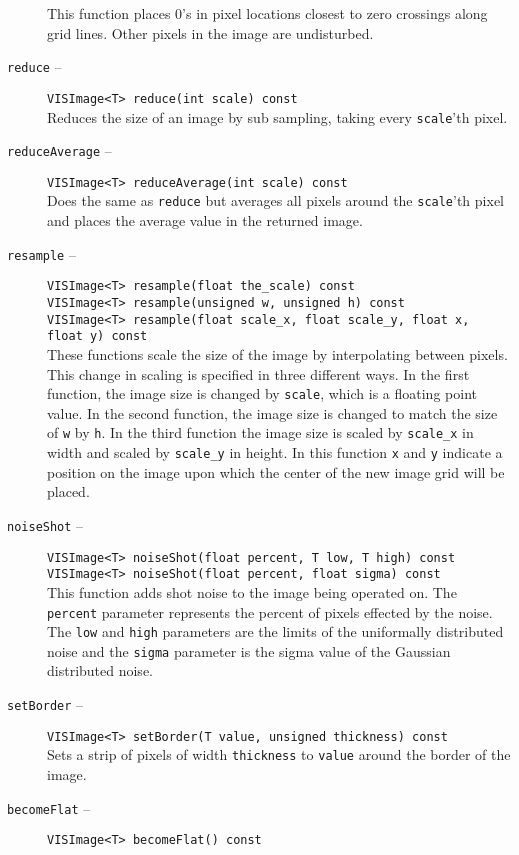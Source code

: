 \begin{description}
This function places 0's in pixel locations closest to zero crossings
along grid lines.  Other pixels in the image are undisturbed.
\item[{\tt reduce} --]
{\tt VISImage<T> reduce(int scale) const}\\
Reduces the size of an image by sub sampling, taking every {\tt scale}'th pixel.
\item[{\tt reduceAverage} --]
{\tt VISImage<T> reduceAverage(int scale) const}\\
Does the same as {\tt reduce} but averages all pixels around the
{\tt scale}'th pixel and places the average value in the returned image.
\item[{\tt resample} --]
{\tt VISImage<T> resample(float the\_scale) const}\\
{\tt VISImage<T> resample(unsigned w, unsigned h) const}\\
{\tt VISImage<T> resample(float scale\_x, float scale\_y, float x, float y) const}\\
These functions scale the size of the image by interpolating between
pixels.  This change in scaling is specified in three different ways.
In the first function, the image size is changed by {\tt scale}, which
is a floating point value.  In the second function, the image size
is changed to match the size of {\tt w} by {\tt h}.  In the third
function the image size is scaled by {\tt scale\_x} in width and scaled by
{\tt scale\_y} in height.  In this function {\tt x} and {\tt y} indicate
a position on the image upon which the center of the new image grid
will be placed.
\item[{\tt noiseShot} --]
{\tt VISImage<T> noiseShot(float percent, T low, T high) const}\\
{\tt VISImage<T> noiseShot(float percent, float sigma) const}\\
This function adds shot noise to the image being operated on.
The {\tt percent} parameter represents the percent of pixels effected
by the noise.  The {\tt low} and {\tt high} parameters are the limits
of the uniformally distributed noise and the {\tt sigma} parameter
is the sigma value of the Gaussian distributed noise.
\item[{\tt setBorder} --]
{\tt VISImage<T> setBorder(T value, unsigned thickness) const}\\
Sets a strip of pixels of width {\tt thickness} to {\tt value} around the
border of the image.
\item[{\tt becomeFlat} --]
{\tt VISImage<T> becomeFlat() const}\\

\end{description}
